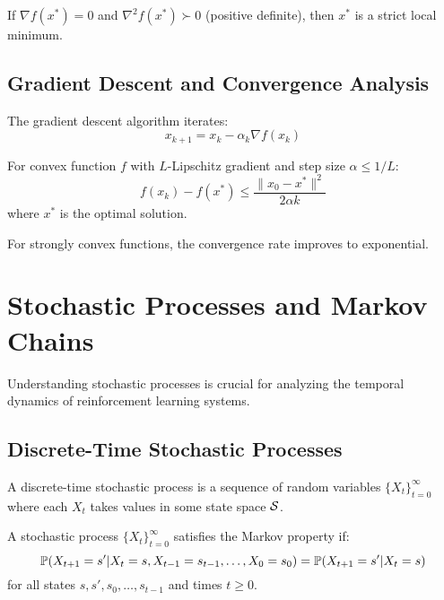 \begin{theorem}
If $\nabla f(x^*) = 0$ and $\nabla^2 f(x^*) \succ 0$ (positive definite), then $x^*$ is a strict local minimum.
\end{theorem}

\subsection{Gradient Descent and Convergence Analysis}

The gradient descent algorithm iterates:
\begin{equation}
x_{k+1} = x_k - \alpha_k \nabla f(x_k)
\end{equation}

\begin{theorem}
For convex function $f$ with $L$-Lipschitz gradient and step size $\alpha \leq 1/L$:
\begin{equation}
f(x_k) - f(x^*) \leq \frac{\|x_0 - x^*\|^2}{2\alpha k}
\end{equation}
where $x^*$ is the optimal solution.
\end{theorem}

For strongly convex functions, the convergence rate improves to exponential.

\section{Stochastic Processes and Markov Chains}

Understanding stochastic processes is crucial for analyzing the temporal dynamics of reinforcement learning systems.

\subsection{Discrete-Time Stochastic Processes}

\begin{definition}
A discrete-time stochastic process is a sequence of random variables $\{X_t\}_{t=0}^\infty$ where each $X_t$ takes values in some state space $\mathcal{S}$.
\end{definition}

\begin{definition}
A stochastic process $\{X_t\}_{t=0}^\infty$ satisfies the Markov property if:
\begin{equation}
\mathbb{P}(X_{t+1} = s' | X_t = s, X_{t-1} = s_{t-1}, \ldots, X_0 = s_0) = \mathbb{P}(X_{t+1} = s' | X_t = s)
\end{equation}
for all states $s, s', s_0, \ldots, s_{t-1}$ and times $t \geq 0$.
\end{definition}

